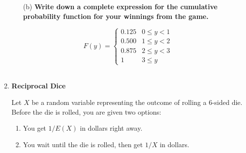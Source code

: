 \documentclass[12pt,a4paper]{article}
\numberwithin{equation}{subsection}
\begin{document}
\begin{enumerate}
\begin{enumerate}
    \item[(b)] \textbf{Write down a complete expression for the cumulative probability function for your winnings from the game.}
\end{enumerate}
\begin{equation*}
    \textit{F}(\textit{y}) =
    \begin{cases}
    0.125 & 0 \le y < 1 \\
    0.500 & 1 \le y < 2 \\
    0.875 & 2 \le y < 3 \\
    1 & 3 \le y
    \end{cases}
\end{equation*} \\


\item \textbf{Reciprocal Dice}

Let $X$ be a random variable representing the outcome of rolling a 6-sided die.  Before the die is rolled, you are given two options:

\begin{enumerate}
\item You get $1/E(X)$ in dollars right away.
\item You wait until the die is rolled, then get $1/X$ in dollars.
\end{enumerate}


\end{enumerate}
\end{document}
